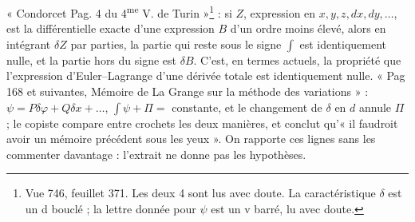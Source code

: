 \documentclass[11pt,a4paper]{article}
\begin{document}
« Condorcet Pag. 4 du 4\textsuperscript{me} V. de Turin »\footnote{Vue 746, feuillet 371. Les deux 4 sont lus avec doute. La caractéristique $\delta$ est un d bouclé ; la lettre donnée pour $\psi$ est un v barré, lu avec doute.} : si $Z$, expression en $x,y,z,dx,dy,\dots$, est la différentielle exacte d'une expression $B$ d'un ordre moins élevé, alors en intégrant $\delta Z$ par parties, la partie qui reste sous le signe $\int$ est identiquement nulle, et la partie hors du signe est $\delta B$. C'est, en termes actuels, la propriété que l'expression d'Euler--Lagrange d'une dérivée totale est identiquement nulle. « Pag 168 et suivantes, Mémoire de La Grange sur la méthode des variations » : $\psi=P\delta\varphi+Q\delta x+\dots$, $\int\psi+\Pi=$ constante, et le changement de $\delta$ en $d$ annule $\Pi$ ; le copiste compare entre crochets les deux manières, et conclut qu'« il faudroit avoir un mémoire précédent sous les yeux ». On rapporte ces lignes sans les commenter davantage : l'extrait ne donne pas les hypothèses.
\end{document}

